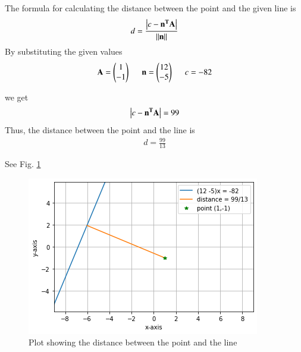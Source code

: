 
The formula for calculating the distance between the point and the given line is 
\begin{align}
d = \frac{\left\vert c-\mathbf{n^TA}\right\vert}{\left\lVert\mathbf{n}\right\rVert}
\end{align}
By substituting the given values 
\begin{align}
\mathbf{A} = \begin{pmatrix}1 \\ -1\end{pmatrix} \hspace{0.5cm}  \mathbf{n} = \begin{pmatrix}12 \\ -5\end{pmatrix} \hspace{0.5cm}   c = -82
\end{align}

we get  
\begin{align}
\left\vert c-\mathbf{n^TA}\right\vert = 99
\end{align}
Thus, the distance between the point and the line is
\begin{align}
d = \frac{99}{13}
\end{align}

See Fig. \ref{fig:solutions/line_plane/33/}

\begin{figure}
\centering
\includegraphics[width=\columnwidth]{./solutions/line_plane/33/output.png}
\caption{Plot showing the distance between the point and the line}
\label{fig:solutions/line_plane/33/}
\end{figure}
